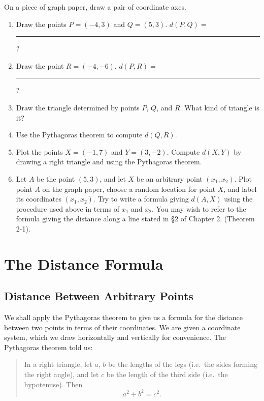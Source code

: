 \documentclass[12pt]{book} %
\begin{document}
On a piece of graph paper, draw a pair of coordinate axes.
\begin{enumerate}
\item Draw the points $P=(-4,3)$ and $Q=(5,3)$. $d(P,Q)=$ \rule{2cm}{0.4pt} ?

\item Draw the point $R=(-4,-6)$. $d(P,R)=$ \rule{2cm}{0.4pt} ?

\item Draw the triangle determined by points $P$, $Q$, and $R$. What kind of triangle is it?

\item Use the Pythagoras theorem to compute $d(Q,R)$.

\item Plot the points $X=(-1,7)$ and $Y=(3,-2)$. Compute $d(X,Y)$ by drawing a right triangle and using the Pythagoras theorem.

\item Let $A$ be the point $(5,3)$, and let $X$ be an arbitrary point $(x_1,x_2)$. Plot point $A$ on the graph paper, choose a random location for point $X$, and label its coordinates $(x_1,x_2)$. Try to write a formula giving $d(A,X)$ using the procedure used above in terms of $x_1$ and $x_2$. You may wish to refer to the formula giving the distance along a line stated in \S 2 of Chapter 2. (Theorem 2-1).
\end{enumerate}

\chapter{The Distance Formula}

\section{Distance Between Arbitrary Points}

We shall apply the Pythagoras theorem to give us a formula for the distance between two points in terms of their coordinates. We are given a coordinate system, which we draw horizontally and vertically for convenience. The Pythagoras theorem told us:

\begin{quote}
In a right triangle, let $a$, $b$ be the lengths of the legs (i.e.\ the sides forming the right angle), and let $c$ be the length of the third side (i.e.\ the hypotenuse). Then
\[
a^2+b^2=c^2.
\]
\end{quote}

\end{document}
